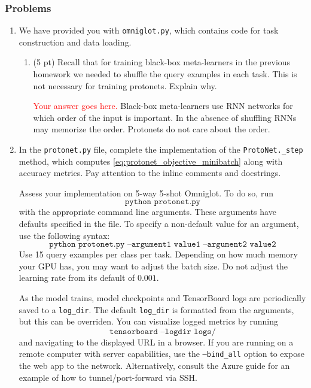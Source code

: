 \documentclass[12pt]{article}
\begin{document}
\subsubsection*{Problems}


\begin{enumerate}
    \item We have provided you with \texttt{omniglot.py}, which contains code for task construction and data loading.
    \begin{enumerate}[label=(\alph*)]
        \item (5 pt) Recall that for training black-box meta-learners in the previous homework we needed to shuffle the query examples in each task. This is not necessary for training protonets. Explain why.
        
        \textcolor{red}{Your answer goes here.}
        Black-box meta-learners use RNN networks for which order of the input is important. In the absence of shuffling RNNs may memorize the order. Protonets do not care about the order.
    \end{enumerate}
    
    \newpage
    \item In the \texttt{protonet.py} file, complete the implementation of the \texttt{ProtoNet.\_step} method, which computes \eqref{eq:protonet_objective_minibatch} along with accuracy metrics. Pay attention to the inline comments and docstrings.
    
    Assess your implementation on 5-way 5-shot Omniglot. To do so, run 
    \begin{equation*} 
        \texttt{python protonet.py} 
    \end{equation*}
    with the appropriate command line arguments. These arguments have defaults specified in the file. To specify a non-default value for an argument, use the following syntax:
    \begin{equation*}
        \texttt{python protonet.py --argument1 value1 --argument2 value2}
    \end{equation*}
    Use 15 query examples per class per task. Depending on how much memory your GPU has, you may want to adjust the batch size. Do not adjust the learning rate from its default of $0.001$.
    
     As the model trains, model checkpoints and TensorBoard logs are periodically saved to a \texttt{log\_dir}. The default \texttt{log\_dir} is formatted from the arguments, but this can be overriden. You can visualize logged metrics by running
    \begin{equation*}
        \texttt{tensorboard --logdir logs/}
    \end{equation*}
    and navigating to the displayed URL in a browser. If you are running on a remote computer with server capabilities, use the \texttt{--bind\_all} option to expose the web app to the network. Alternatively, consult the Azure guide for an example of how to tunnel/port-forward via SSH.
    

\end{enumerate}
\end{document}
